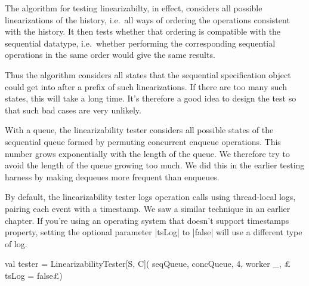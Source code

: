 \begin{slide}

The algorithm for testing linearizabilty, in effect, considers all possible
linearizations of the history, i.e.~all ways of ordering the operations
consistent with the history.  It then tests whether that ordering is
compatible with the sequential datatype, i.e.~whether performing the
corresponding sequential operations in the same order would give the same
results. 

Thus the algorithm considers all  states that the sequential
specification object could get into after a prefix of such linearizations.
%
If there are too many such states, this will take a long time.  It's therefore
a good idea to design the test so that such bad cases are very unlikely.
\end{slide}


\begin{slide}

With a queue, the linearizability tester considers all possible states of the
sequential queue formed by permuting concurrent enqueue operations.  This
number grows exponentially with the length of the queue.  We therefore try to
avoid the length of the queue growing too much.  We did this in the earlier
testing harness by making dequeues more frequent than enqueues.
\end{slide}


\begin{slide}

By default, the linearizability tester logs operation calls using thread-local
logs, pairing each event with a timestamp.  We saw a similar technique in an
earlier chapter.  If you're using an operating system that doesn't support
timestamps property, setting the optional parameter |tsLog| to |false| will
use a different type of log. 
%
\begin{scala}
  val tester = LinearizabilityTester[S, C](
    seqQueue, concQueue, 4, worker _, £\scalastyle\color{red} tsLog = false£)
\end{scala}
\end{slide}



